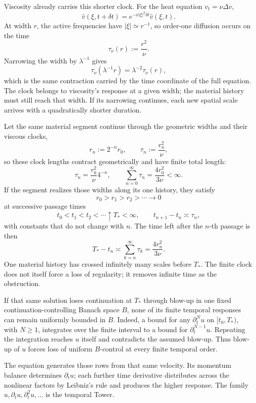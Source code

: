 
Viscosity already carries this shorter clock.
For the heat equation \(v_t=\nu\Delta v\),
\[
  \widehat v(\xi,t+\delta t)
  =
  e^{-\nu|\xi|^2\delta t}\widehat v(\xi,t).
\]
At width \(r\), the active frequencies have \(|\xi|\simeq r^{-1}\), so order-one diffusion occurs on the time
\[
  \tau_\nu(r)
  :=
  \frac{r^2}{\nu}.
\]
Narrowing the width by \(\lambda^{-1}\) gives
\[
  \tau_\nu(\lambda^{-1}r)
  =
  \lambda^{-2}\tau_\nu(r),
\]
which is the same contraction carried by the time coordinate of the full equation.
The clock belongs to viscosity's response at a given width; the material history must still reach that width.
If its narrowing continues, each new spatial scale arrives with a quadratically shorter duration.


Let the same material segment continue through the geometric widths and their viscous clocks,
\[
  r_n:=2^{-n}r_0,
  \qquad
  \tau_n:=\frac{r_n^2}{\nu},
\]
so these clock lengths contract geometrically and have finite total length:
\[
  \tau_n
  =
  \frac{r_0^2}{\nu}4^{-n},
  \qquad
  \sum_{n=0}^{\infty}\tau_n
  =
  \frac{4r_0^2}{3\nu}
  <
  \infty.
\]
If the segment realizes those widths along its one history, they satisfy
\[
  r_0>r_1>r_2>\cdots\longrightarrow0
\]
at successive passage times
\[
  t_0<t_1<t_2<\cdots\uparrow T_*<\infty,
  \qquad
  t_{n+1}-t_n\asymp\tau_n,
\]
with constants that do not change with \(n\).
The time left after the \(n\)-th passage is then
\[
  T_*-t_n
  \asymp
  \sum_{k=n}^{\infty}\tau_k
  =
  \frac{4r_n^2}{3\nu}.
\]
One material history has crossed infinitely many scales before \(T_*\).
The finite clock does not itself force a loss of regularity; it removes infinite time as the obstruction.

If that same solution loses continuation at \(T_*\) through blow-up in one fixed continuation-controlling Banach space \(B\), none of its finite temporal responses can remain uniformly bounded in \(B\).
Indeed, a bound for any \(\partial_t^N u\) on \([t_0,T_*)\), with \(N\geq1\), integrates over the finite interval to a bound for \(\partial_t^{N-1}u\).
Repeating the integration reaches \(u\) itself and contradicts the assumed blow-up.
Thus blow-up of \(u\) forces loss of uniform \(B\)-control at every finite temporal order.

The \NavierStokes{} equation generates those rows from that same velocity.
Its momentum balance determines \(\partial_tu\); each further time derivative distributes across the nonlinear factors by Leibniz's rule and produces the higher response.
The family \(u,\partial_tu,\partial_t^2u,\ldots\) is the temporal Tower.

